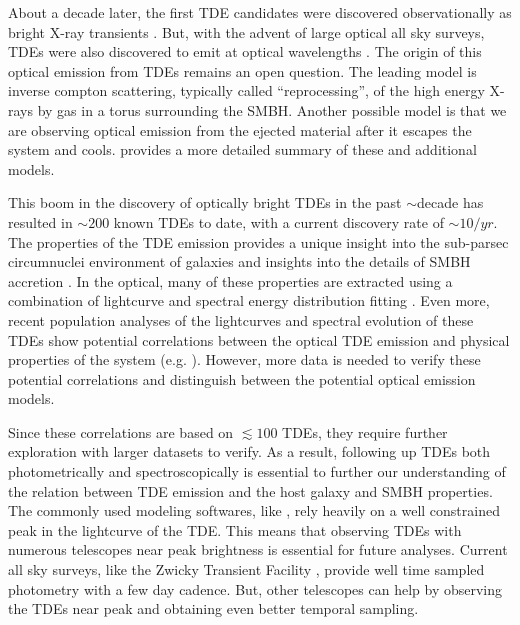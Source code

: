 \documentclass{aastex631}
\begin{document}
About a decade later, the first TDE candidates were discovered observationally as bright X-ray transients \citep{donley2002}. But, with the advent of large optical all sky surveys, TDEs were also discovered to emit at optical wavelengths \citep{iPTF,ZTF,panstarrstde}. The origin of this optical emission from TDEs remains an open question. The leading model is inverse compton scattering, typically called ``reprocessing'', of the high energy X-rays by gas in a torus surrounding the SMBH. Another possible model is that we are observing optical emission from the ejected material after it escapes the system and cools. \citet{gezari2021} provides a more detailed summary of these and additional models. 

This boom in the discovery of optically bright TDEs in the past $\sim$decade has resulted in $\sim200$ known TDEs to date, with a current discovery rate of $\sim10/yr$. The properties of the TDE emission provides a unique insight into the sub-parsec circumnuclei environment of galaxies and insights into the details of SMBH accretion \citep{holoien2020,Newsome2024}. In the optical, many of these properties are extracted using a combination of lightcurve and spectral energy distribution fitting \citep{Mockler2019}. Even more, recent population analyses of the lightcurves and spectral evolution of these TDEs show potential correlations between the optical TDE emission and physical properties of the system (e.g. \citet{vanVelzen2021}). However, more data is needed to verify these potential correlations and distinguish between the potential optical emission models.

Since these correlations are based on $\lesssim 100$ TDEs, they require further exploration with larger datasets to verify. As a result, following up TDEs both photometrically and spectroscopically is essential to further our understanding of the relation between TDE emission and the host galaxy and SMBH properties. The commonly used modeling softwares, like \citet{Mockler2019}, rely heavily on a well constrained peak in the lightcurve of the TDE. This means that observing TDEs with numerous telescopes near peak brightness is essential for future analyses. Current all sky surveys, like the Zwicky Transient Facility \citep[ZTF]{ZTF}, provide well time sampled photometry with a few day cadence. But, other telescopes can help by observing the TDEs near peak and obtaining even better temporal sampling.
\end{document}

